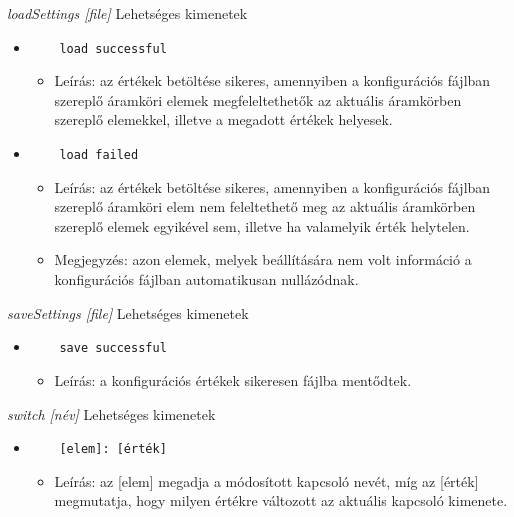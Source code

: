 \textit{loadSettings [file]}\newline
Lehetséges kimenetek
\begin{itemize}
	\item
	\begin{verbatim}
	load successful
	\end{verbatim}
	\begin{itemize}
		\item Leírás: az értékek betöltése sikeres, amennyiben a konfigurációs fájlban szereplő áramköri elemek megfeleltethetők az aktuális áramkörben szereplő elemekkel, illetve a megadott értékek helyesek.
	\end{itemize}
	\item
	\begin{verbatim}
	load failed
	\end{verbatim}
	\begin{itemize}
		\item Leírás: az értékek betöltése sikeres, amennyiben a konfigurációs fájlban szereplő áramköri elem nem feleltethető meg az aktuális áramkörben szereplő elemek egyikével sem, illetve ha valamelyik érték helytelen.
		\item Megjegyzés: azon elemek, melyek beállítására nem volt információ a konfigurációs fájlban automatikusan nullázódnak.
	\end{itemize}
\end{itemize}

\textit{saveSettings [file]}\newline
Lehetséges kimenetek
\begin{itemize}
	\item
	\begin{verbatim}
	save successful
	\end{verbatim}
	\begin{itemize}
		\item Leírás: a konfigurációs értékek sikeresen fájlba mentődtek.
	\end{itemize}
\end{itemize}

\textit{switch [név]}\newline
Lehetséges kimenetek
\begin{itemize}
	\item
	\begin{verbatim}
	[elem]: [érték]
	\end{verbatim}
	\begin{itemize}
		\item Leírás: az [elem] megadja a módosított kapcsoló nevét, míg az [érték] megmutatja, hogy milyen értékre változott az aktuális kapcsoló kimenete. 
	\end{itemize}
\end{itemize}

